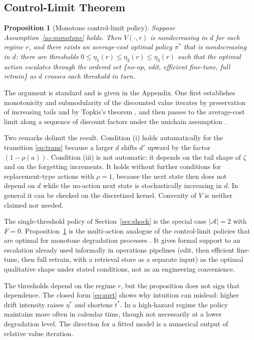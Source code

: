 \documentclass[journal]{IEEEtran}
\newtheorem{proposition}{Proposition}
\begin{document}
\subsection{Control-Limit Theorem}
\begin{proposition}[Monotone control-limit policy]\label{prop:cl}
Suppose Assumption~\ref{as:monotone} holds. Then $V(\cdot,r)$ is nondecreasing in $d$ for each regime $r$, and there exists an average-cost optimal policy $\pi^\ast$ that is nondecreasing in $d$: there are thresholds $0\le\eta_1(r)\le\eta_2(r)\le\eta_3(r)$ such that the optimal action escalates through the ordered set \{no-op, edit, efficient fine-tune, full retrain\} as $d$ crosses each threshold in turn.
\end{proposition}
The argument is standard and is given in the Appendix. One first establishes monotonicity and submodularity of the discounted value iterates by preservation of increasing tails and by Topkis's theorem \cite{topkis1998}, and then passes to the average-cost limit along a sequence of discount factors under the unichain assumption \cite{puterman1994}.

Two remarks delimit the result. Condition (i) holds automatically for the transition \eqref{eq:trans} because a larger $d$ shifts $d'$ upward by the factor $(1-\rho(a))$. Condition (iii) is not automatic: it depends on the tail shape of $\zeta$ and on the forgetting increments. It holds without further conditions for replacement-type actions with $\rho=1$, because the next state then does not depend on $d$ while the no-action next state is stochastically increasing in $d$. In general it can be checked on the discretized kernel. Convexity of $V$ is neither claimed nor needed.

The single-threshold policy of Section~\ref{sec:shock} is the special case $|\mathcal A|=2$ with $F=0$. Proposition~\ref{prop:cl} is the multi-action analogue of the control-limit policies that are optimal for monotone degradation processes \cite{wang2002}. It gives formal support to an escalation already used informally in operations pipelines (edit, then efficient fine-tune, then full retrain, with a retrieval store as a separate input) as the optimal qualitative shape under stated conditions, not as an engineering convenience.

The thresholds depend on the regime $r$, but the proposition does not sign that dependence. The closed form \eqref{eq:sqrt} shows why intuition can mislead: higher drift intensity raises $\eta^\ast$ and shortens $t^\ast$. In a high-hazard regime the policy maintains more often in calendar time, though not necessarily at a lower degradation level. The direction for a fitted model is a numerical output of relative value iteration.
\end{document}
